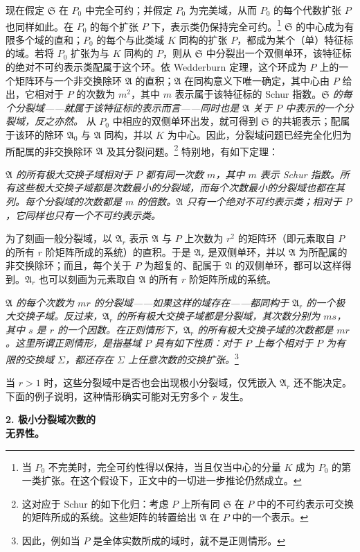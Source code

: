 \documentclass[11pt]{article}
\providecommand{\srcspaced}[1]{\emph{#1}}
\providecommand{\mS}{\mathfrak{S}}
\providecommand{\mA}{\mathfrak{A}}
\begin{document}
现在假定 $\mS$ 在 $P_0$ 中完全可约；并假定 $P_0$ 为完美域，从而 $P_0$ 的每个代数扩张 $P$ 也同样如此。在 $P_0$ 的每个扩张 $P$ 下，表示类仍保持完全可约。\footnote{当 $P_0$ 不完美时，完全可约性得以保持，当且仅当中心的分量 $K$ 成为 $P_0$ 的\guillemotright{}第一类扩张\guillemotleft{}。在这个假设下，正文中的一切进一步推论仍然成立。} $\mS$ 的中心成为有限多个域的直和；$P_0$ 的每个与此类域 $K$ 同构的扩张 $P$，都成为某个（单）特征标的域。若将 $P_0$ 扩张为与 $K$ 同构的 $P$，则从 $\mS$ 中分裂出一个双侧单环，该特征标的绝对不可约表示类配属于这个环。依 Wedderburn 定理，这个环成为 $P$ 上的一个矩阵环与一个非交换除环 $\mA$ 的直积；$\mA$ 在同构意义下唯一确定，其中心由 $P$ 给出，它相对于 $P$ 的次数为 $m^2$，其中 $m$ 表示属于该特征标的 Schur 指数。\srcspaced{$\mS$ 的每个分裂域——就属于该特征标的表示而言——同时也是 $\mA$ 关于 $P$ 中表示的一个分裂域，反之亦然。} 从 $P_0$ 中相应的双侧单环出发，就可得到 $\mS$ 的共轭表示；配属于该环的除环 $\mA_0$ 与 $\mA$ 同构，并以 $K$ 为中心。因此，分裂域问题已经完全化归为所配属的非交换除环 $\mA$ 及其分裂问题。\footnote{这对应于 Schur 的如下化归：考虑 $P$ 上所有同 $\mS$ 在 $P$ 中的不可约表示可交换的矩阵所成的系统。这些矩阵的转置给出 $\mA$ 在 $P$ 中的一个表示。} 特别地，有如下定理：

\srcspaced{$\mA$ 的所有极大交换子域相对于 $P$ 都有同一次数 $m$，其中 $m$ 表示 Schur 指数。所有这些极大交换子域都是次数最小的分裂域，而每个次数最小的分裂域也都在其列。每个分裂域的次数都是 $m$ 的倍数。$\mA$ 只有一个绝对不可约表示类；相对于 $P$，它同样也只有一个不可约表示类。}

为了刻画一般分裂域，以 $\mA_r$ 表示 $\mA$ 与 $P$ 上次数为 $r^2$ 的矩阵环（即元素取自 $P$ 的所有 $r$ 阶矩阵所成的系统）的直积。于是 $\mA_r$ 是双侧单环，并以 $\mA$ 为所配属的非交换除环；而且，每个关于 $P$ 为超复的、配属于 $\mA$ 的双侧单环，都可以这样得到。$\mA_r$ 也可以刻画为元素取自 $\mA$ 的所有 $r$ 阶矩阵所成的系统。

\srcspaced{$\mA$ 的每个次数为 $mr$ 的分裂域——如果这样的域存在——都同构于 $\mA_r$ 的一个极大交换子域。反过来，$\mA_r$ 的所有极大交换子域都是分裂域，其次数分别为 $ms$，其中 $s$ 是 $r$ 的一个因数。在正则情形下，$\mA_r$ 的所有极大交换子域的次数都是 $mr$。这里所谓正则情形，是指基域 $P$ 具有如下性质：对于 $P$ 上每个相对于 $P$ 为有限的交换域 $\Sigma$，都还存在 $\Sigma$ 上任意次数的交换扩张。}\footnote{因此，例如当 $P$ 是全体实数所成的域时，就不是正则情形。}

当 $r>1$ 时，这些分裂域中是否也会出现极小分裂域，仅凭嵌入 $\mA_r$ 还不能决定。下面的例子说明，这种情形确实可能对无穷多个 $r$ 发生。

\begin{center}
\textbf{2. 极小分裂域次数的\\
无界性。}
\end{center}
\end{document}
